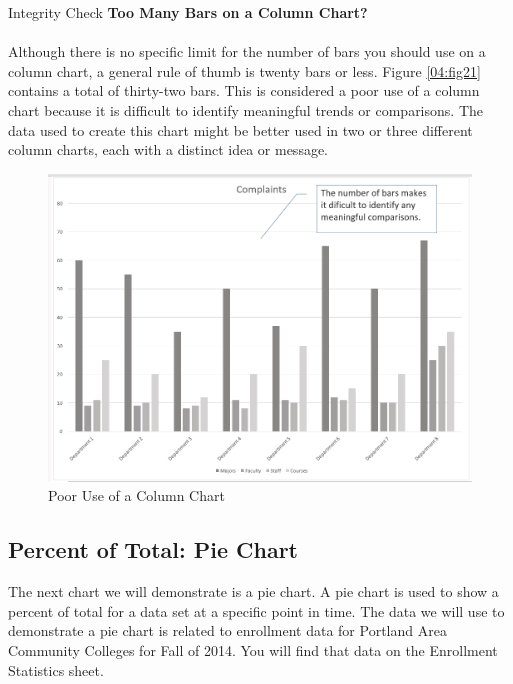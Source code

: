 \begin{center}
	\begin{infobox}{Integrity Check}
		\textbf{Too Many Bars on a Column Chart?}
		\\
		\\
		 Although there is no specific limit for the number of bars you should use on a column chart, a general rule of thumb is twenty bars or less. Figure \ref{04:fig21} contains a total of thirty-two bars. This is considered a poor use of a column chart because it is difficult to identify meaningful trends or comparisons. The data used to create this chart might be better used in two or three different column charts, each with a distinct idea or message.
	\end{infobox}
\end{center}

\begin{figure}[H]
	\centering
	\includegraphics[width=\maxwidth{.95\linewidth}]{gfx/ch04_fig19}
	\caption{Poor Use of a Column Chart}
	\label{04:fig19}
\end{figure}

\subsection{Percent of Total: Pie Chart}

The next chart we will demonstrate is a pie chart. A pie chart is used to show a percent of total for
a data set at a specific point in time. The data we will use to demonstrate a pie chart is related to
enrollment data for Portland Area Community Colleges for Fall of 2014. You will find that data on
the Enrollment Statistics sheet.

